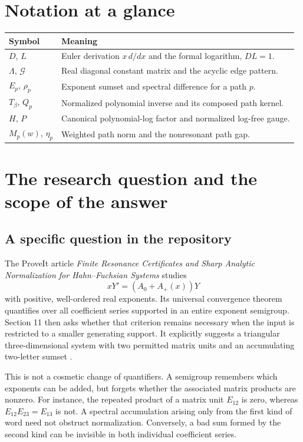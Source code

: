 \documentclass[11pt,a4paper]{article}
\numberwithin{equation}{section}
\theoremstyle{definition}
\theoremstyle{remark}
\newcommand{\G}{\mathcal G}
\begin{document}
\section*{Notation at a glance}
\begin{center}
\begin{tabularx}{\textwidth}{@{}lX@{}}
\toprule
Symbol & Meaning\\
\midrule
$D$, $L$ & Euler derivation $x\,d/dx$ and the formal logarithm, $DL=1$.\\
$\Lambda$, $\G$ & Real diagonal constant matrix and the acyclic edge pattern.\\
$E_p$, $\rho_p$ & Exponent sumset and spectral difference for a path $p$.\\
$T_\beta$, $Q_p$ & Normalized polynomial inverse and its composed path kernel.\\
$H$, $P$ & Canonical polynomial-log factor and normalized log-free gauge.\\
$M_p(w)$, $\eta_p$ & Weighted path norm and the nonresonant path gap.\\
\bottomrule
\end{tabularx}
\end{center}
\newpage

\section{The research question and the scope of the answer}
\label{sec:orientation}

\subsection{A specific question in the repository}
The ProveIt article \emph{Finite Resonance Certificates and Sharp Analytic
Normalization for Hahn--Fuchsian Systems} studies
\[
 xY'=(A_0+A_+(x))Y
\]
with positive, well-ordered real exponents. Its universal convergence theorem
quantifies over all coefficient series supported in an entire exponent
semigroup. Section 11 then asks whether that criterion remains necessary
when the input is restricted to a smaller generating support. It explicitly
suggests a triangular three-dimensional system with two permitted matrix
units and an accumulating two-letter sumset \cite{repo-hahn}.

This is not a cosmetic change of quantifiers. A semigroup remembers which
exponents can be added, but forgets whether the associated matrix products
are nonzero. For instance, the repeated product of a matrix unit $E_{12}$
is zero, whereas $E_{12}E_{23}=E_{13}$ is not. A spectral accumulation arising
only from the first kind of word need not obstruct normalization. Conversely,
a bad sum formed by the second kind can be invisible in both individual
coefficient series.
\end{document}
